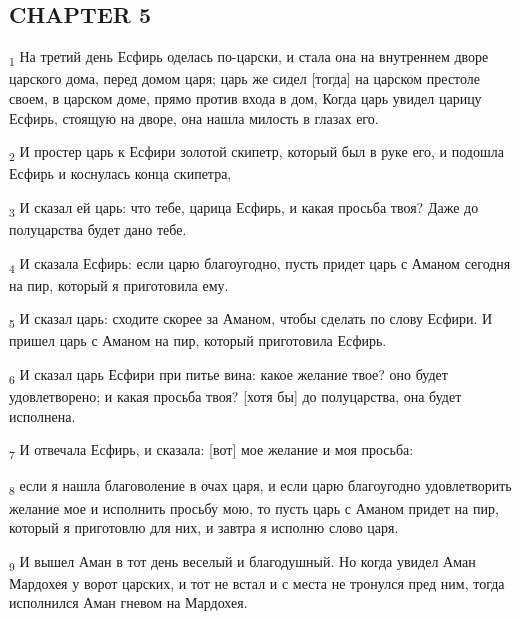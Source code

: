 \subsection{CHAPTER 5}
\begin{tcolorbox}
\textsubscript{1} На третий день Есфирь оделась по-царски, и стала она на внутреннем дворе царского дома, перед домом царя; царь же сидел [тогда] на царском престоле своем, в царском доме, прямо против входа в дом, Когда царь увидел царицу Есфирь, стоящую на дворе, она нашла милость в глазах его.
\end{tcolorbox}
\begin{tcolorbox}
\textsubscript{2} И простер царь к Есфири золотой скипетр, который был в руке его, и подошла Есфирь и коснулась конца скипетра,
\end{tcolorbox}
\begin{tcolorbox}
\textsubscript{3} И сказал ей царь: что тебе, царица Есфирь, и какая просьба твоя? Даже до полуцарства будет дано тебе.
\end{tcolorbox}
\begin{tcolorbox}
\textsubscript{4} И сказала Есфирь: если царю благоугодно, пусть придет царь с Аманом сегодня на пир, который я приготовила ему.
\end{tcolorbox}
\begin{tcolorbox}
\textsubscript{5} И сказал царь: сходите скорее за Аманом, чтобы сделать по слову Есфири. И пришел царь с Аманом на пир, который приготовила Есфирь.
\end{tcolorbox}
\begin{tcolorbox}
\textsubscript{6} И сказал царь Есфири при питье вина: какое желание твое? оно будет удовлетворено; и какая просьба твоя? [хотя бы] до полуцарства, она будет исполнена.
\end{tcolorbox}
\begin{tcolorbox}
\textsubscript{7} И отвечала Есфирь, и сказала: [вот] мое желание и моя просьба:
\end{tcolorbox}
\begin{tcolorbox}
\textsubscript{8} если я нашла благоволение в очах царя, и если царю благоугодно удовлетворить желание мое и исполнить просьбу мою, то пусть царь с Аманом придет на пир, который я приготовлю для них, и завтра я исполню слово царя.
\end{tcolorbox}
\begin{tcolorbox}
\textsubscript{9} И вышел Аман в тот день веселый и благодушный. Но когда увидел Аман Мардохея у ворот царских, и тот не встал и с места не тронулся пред ним, тогда исполнился Аман гневом на Мардохея.
\end{tcolorbox}
